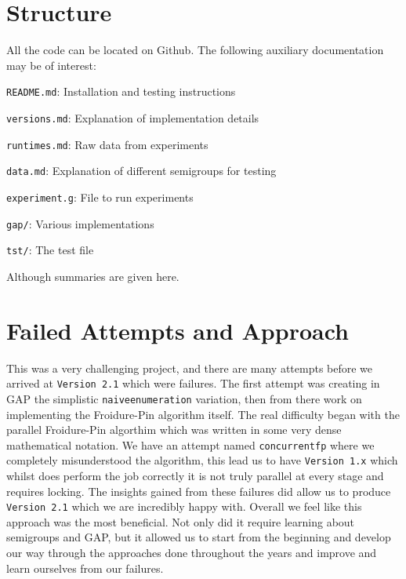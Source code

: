 \documentclass{report}
\begin{document}
\section*{Structure}
All the code can be located on Github\cite{project}. The following auxiliary documentation may be of interest:
\newline
\begin{description}
\item \texttt{README.md}: Installation and testing instructions
\item \texttt{versions.md}: Explanation of implementation details
\item \texttt{runtimes.md}: Raw data from experiments
\item \texttt{data.md}: Explanation of different semigroups for testing
\item \texttt{experiment.g}: File to run experiments
\item \texttt{gap/}: Various implementations
\item \texttt{tst/}: The test file
\end{description}

Although summaries are given here. 

\section*{Failed Attempts and Approach}
This was a very challenging project, and there are many attempts before we arrived at \texttt{Version 2.1} which were failures.
The first attempt was creating in GAP the simplistic \texttt{naiveenumeration} variation, then from there work on implementing the
Froidure-Pin algorithm itself.
\newline
The real difficulty began with the parallel Froidure-Pin algorthim which was written in some very dense mathematical notation.
We have an attempt named \texttt{concurrentfp} where we completely misunderstood the algorithm, this lead us to have \texttt{Version 1.x} which whilst
does perform the job correctly it is not truly parallel at every stage and requires locking.
The insights gained from these failures did allow us to produce \texttt{Version 2.1} which we are incredibly happy with.
\newline
Overall we feel like this approach was the most beneficial. Not only did it require learning about semigroups and GAP, but it allowed us
to start from the beginning and develop our way through the approaches done throughout the years and improve and learn ourselves from our failures.
\end{document}
